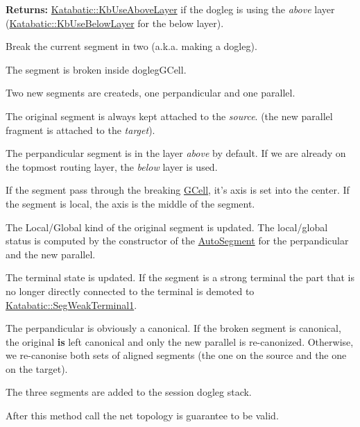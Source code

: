 {\bfseries Returns\-:} \hyperlink{namespaceKatabatic_a2af2ad6b6441614038caf59d04b3b217af756099f1bbe259dd1bf22067dc40eac}{Katabatic\-::\-Kb\-Use\-Above\-Layer} if the dogleg is using the {\itshape above} layer (\hyperlink{namespaceKatabatic_a2af2ad6b6441614038caf59d04b3b217a41cbd981337678e042354f340bfae25d}{Katabatic\-::\-Kb\-Use\-Below\-Layer} for the below layer).

Break the current segment in two (a.\-k.\-a. making a dogleg).
\begin{DoxyItemize}
\item The segment is broken inside {\ttfamily dogleg\-G\-Cell}.
\item Two new segments are createds, one perpandicular and one parallel.
\item The original segment is always kept attached to the {\itshape source}. (the new parallel fragment is attached to the {\itshape target}).
\item The perpandicular segment is in the layer {\itshape above} by default. If we are already on the topmost routing layer, the {\itshape below} layer is used.
\item If the segment pass through the breaking \hyperlink{classKatabatic_1_1GCell}{G\-Cell}, it's axis is set into the center. If the segment is local, the axis is the middle of the segment.
\item The Local/\-Global kind of the original segment is updated. The local/global status is computed by the constructor of the \hyperlink{classKatabatic_1_1AutoSegment}{Auto\-Segment} for the perpandicular and the new parallel.
\item The terminal state is updated. If the segment is a strong terminal the part that is no longer directly connected to the terminal is demoted to \hyperlink{namespaceKatabatic_a94585537ee1724ea9315578ec54380f4a7b3e09b8ab4cf676fd308535d7fba892}{Katabatic\-::\-Seg\-Weak\-Terminal1}.
\item The perpandicular is obviously a canonical. If the broken segment is canonical, the original {\bfseries is} left canonical and only the new parallel is re-\/canonized. Otherwise, we re-\/canonise both sets of aligned segments (the one on the source and the one on the target).
\item The three segments are added to the session dogleg stack.
\end{DoxyItemize}

After this method call the net topology is guarantee to be valid.

  

